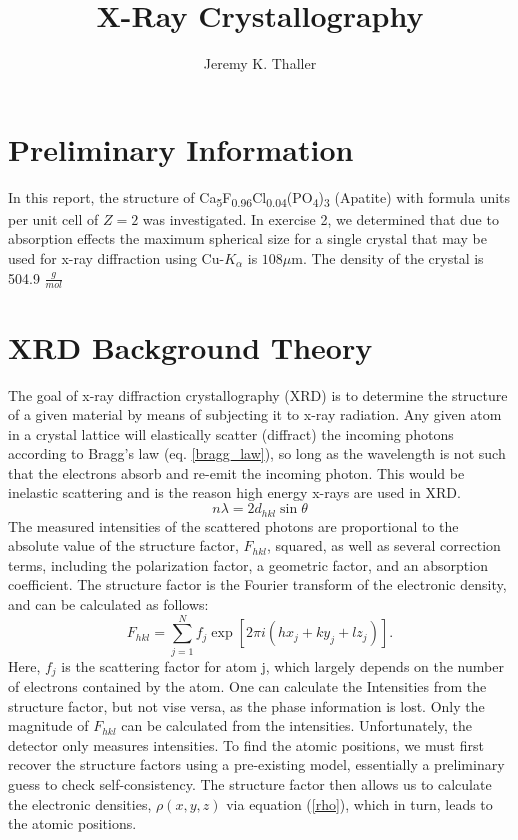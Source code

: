 \documentclass[]{scrartcl}
\title{X-Ray Crystallography}
\author{Jeremy K. Thaller}
\begin{document}
\maketitle

\begin{abstract}

\end{abstract}


\section{Preliminary Information}
In this report, the structure of Ca\textsubscript{5}F\textsubscript{0.96}Cl\textsubscript{0.04}(PO\textsubscript{4})\textsubscript{3} (Apatite) with formula units per unit cell of $Z=2$ was investigated. In exercise 2, we determined that due to absorption effects the maximum spherical size for a single crystal that may be used for x-ray diffraction using Cu-$ K_\alpha $ is $ 108\mu $m. The density of the crystal is 504.9 $ \frac{g}{mol} $


\section{XRD Background Theory}
The goal of x-ray diffraction crystallography (XRD) is to determine the structure of a given material by means of subjecting it to x-ray radiation. Any given atom in a crystal lattice will elastically scatter (diffract) the incoming photons according to Bragg's law (eq. \ref{bragg_law}), so long as the wavelength is not such that the electrons absorb and re-emit the incoming photon. This would be inelastic scattering and is the reason high energy x-rays are used in XRD.
\begin{equation}\label{bragg_law}
n\lambda = 2d_{hkl}\sin{\theta}
\end{equation}
The measured intensities of the scattered photons are proportional to the absolute value of the structure factor, $ F_{hkl} $, squared, as well as several correction terms, including the polarization factor, a geometric factor, and an absorption coefficient. The structure factor is the Fourier transform of the electronic density, and can be calculated as follows:
\begin{equation}
\label{struct_fact}
F_{hkl} = \sum_{j=1}^{N} f_j \exp[2\pi i(hx_j+ky_j+lz_j)]\textrm{.}
\end{equation}
Here, $ f_j $ is the scattering factor for atom j, which largely depends on the number of electrons contained by the atom. One can calculate the Intensities from the structure factor, but not vise versa, as the phase information is lost. Only the magnitude of $ F_{hkl} $ can be calculated from the intensities. Unfortunately, the detector only measures intensities. To find the atomic positions, we must first recover the structure factors using a pre-existing model, essentially a preliminary guess to check self-consistency. The structure factor then allows us to calculate the electronic densities, $ \rho(x,y,z) $ via equation (\ref{rho}), which in turn, leads to the atomic positions.
\end{document}
